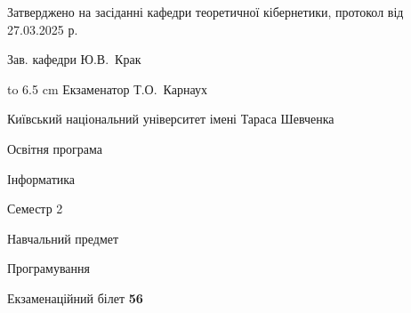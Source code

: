 \documentclass[12pt, ukrainian]{article}
\begin{document}
{\smallskip\smallskip \begin {scriptsize} Затверджено на засіданні кафедри теоретичної кібернетики, протокол   від   27.03.2025 р.\par\smallskip\smallskip\smallskip\smallskip
{\parbox {6.5 cm} {Зав. кафедри \dotfill Ю.В.~Крак}}\hspace {0.7cm} {\hbox to 6.5 cm { Екзаменатор \dotfill Т.О.~Карнаух}} \end{scriptsize}}
\newpage
{{\begin {scriptsize}\par
{ \center  Київський національний університет імені Тараса Шевченка \par}
{\parbox {5 cm}{Освітня програма \hfill}{\parbox {7 cm}{Інформатика\hfill}}\parbox {6 cm}{\hfill Семестр 2}}\par
{\parbox {5 cm} {Навчальний предмет \hfill}\parbox {7 cm}{Програмування \hfill}\parbox {6cm}{\hfill}\par}\vspace{-15pt} \end{scriptsize}}{\center Екзаменаційний білет \No \textbf { 56 }\par}}
\end{document}
